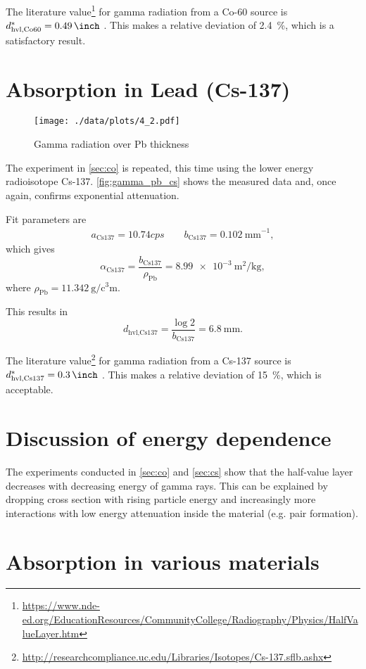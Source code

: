 The literature value\footnote{\url{https://www.nde-ed.org/EducationResources/CommunityCollege/Radiography/Physics/HalfValueLayer.htm}} for gamma radiation from a Co-60 source is $d_\text{hvl,Co60}^{*}=\SI{0.49}{\inch}$ .
This makes a relative deviation of \SI{2.4}{\percent}, which is a satisfactory result.

\section{Absorption in Lead (Cs-137)}\label{sec:cs}
\begin{figure}[ht!]
	\centering
	\texttt{[image: ./data/plots/4\_2.pdf]}
	\caption[Gamma radiation over Pb thickness]{Gamma radiation over Pb thickness}
	\label{fig:gamma_pb_cs}
\end{figure}

The experiment in \autoref{sec:co} is repeated, this time using the lower energy radioisotope Cs-137.
\autoref{fig:gamma_pb_cs} shows the measured data and, once again, confirms exponential attenuation.

Fit parameters are
\begin{gather*}
	a_\text{Cs137}=\num{10.74}cps\qquad b_\text{Cs137}=\SI{0.102}{\milli\meter}^{-1},
\end{gather*}
which gives
\begin{equation*}
	\alpha_\text{Cs137}=\frac{b_\text{Cs137}}{\rho_\text{Pb}}=\SI{8.99e-3}{\meter\squared\per\kilogram},
\end{equation*}
where $\rho_\text{Pb}=\SI{11.342}{\gram\per\cubic\centi\meter}$.

This results in
\begin{equation*}
	d_\text{hvl,Cs137}=\frac{\log{2}}{b_\text{Cs137}}=\SI{6.8}{\milli\meter}.
\end{equation*}

The literature value\footnote{\url{http://researchcompliance.uc.edu/Libraries/Isotopes/Cs-137.sflb.ashx}} for gamma radiation from a Cs-137 source is $d_\text{hvl,Cs137}^{*}=\SI{0.3}{\inch}$ .
This makes a relative deviation of \SI{15}{\percent}, which is acceptable.

\section{Discussion of energy dependence}
The experiments conducted in \autoref{sec:co} and \autoref{sec:cs} show that the half-value layer decreases with decreasing energy of gamma rays.
This can be explained by dropping cross section with rising particle energy and increasingly more interactions with low energy attenuation inside the material (e.g. pair formation).

\section{Absorption in various materials} 
